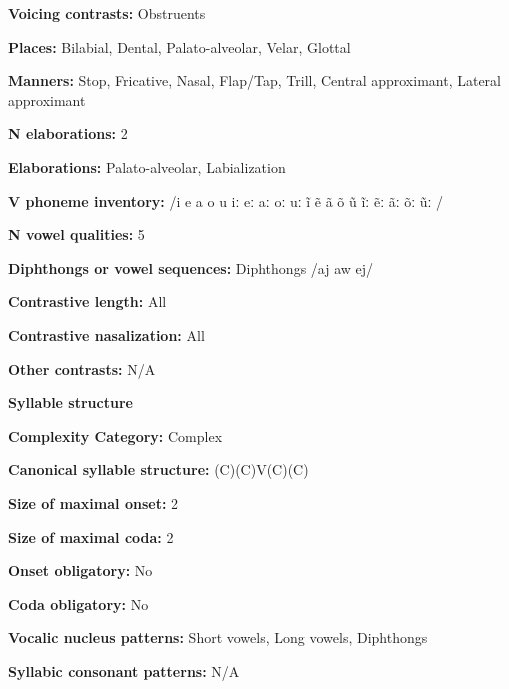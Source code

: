 \textbf{Voicing contrasts:} Obstruents



\textbf{Places:} Bilabial, Dental, Palato-alveolar, Velar, Glottal



\textbf{Manners:} Stop, Fricative, Nasal, Flap/Tap, Trill, Central approximant, Lateral approximant



\textbf{N elaborations:} 2



\textbf{Elaborations:} Palato-alveolar, Labialization



\textbf{V phoneme inventory:} /i e a o u iː eː aː oː uː ĩ ẽ ã õ ũ ĩː ẽː ãː õː ũː /



\textbf{N vowel qualities:} 5



\textbf{Diphthongs or vowel sequences:} Diphthongs /aj aw ej/



\textbf{Contrastive length:} All



\textbf{Contrastive nasalization:} All



\textbf{Other contrasts:} N/A



\textbf{Syllable structure}



\textbf{Complexity Category:} Complex



\textbf{Canonical syllable structure:} (C)(C)V(C)(C) \citep[20-21]{Holt1999}



\textbf{Size of maximal onset:} 2



\textbf{Size of maximal coda:} 2



\textbf{Onset obligatory:} No



\textbf{Coda obligatory:} No



\textbf{Vocalic nucleus patterns:} Short vowels, Long vowels, Diphthongs



\textbf{Syllabic consonant patterns:} N/A



